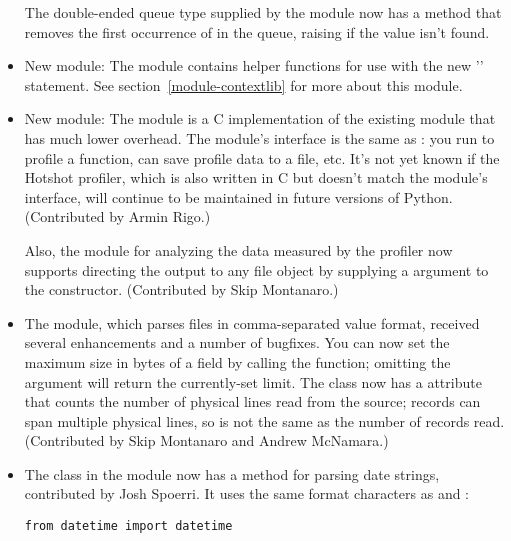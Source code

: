\documentclass{howto}
\begin{document}
\begin{itemize}
The  double-ended queue type supplied by the
 module now has a 
method that removes the first occurrence of  in the queue,
raising  if the value isn't found.

\item New module: The  module contains helper functions for use 
with the new '' statement.  See
section~\ref{module-contextlib} for more about this module.

\item New module: The  module is a C implementation of 
the existing  module that has much lower overhead.
The module's interface is the same as : you run
 to profile a function, can save profile
data to a file, etc.  It's not yet known if the Hotshot profiler,
which is also written in C but doesn't match the 
module's interface, will continue to be maintained in future versions
of Python.  (Contributed by Armin Rigo.)

Also, the  module for analyzing the data measured by
the profiler now supports directing the output to any file object
by supplying a  argument to the  constructor.
(Contributed by Skip Montanaro.)

\item The  module, which parses files in
comma-separated value format, received several enhancements and a
number of bugfixes.  You can now set the maximum size in bytes of a
field by calling the 
function; omitting the  argument will return the
currently-set limit.  The  class now has a
 attribute that counts the number of physical lines
read from the source; records can span multiple physical lines, so
 is not the same as the number of records read.
(Contributed by Skip Montanaro and Andrew McNamara.)

\item The  class in the  
module now has a  
method for parsing date strings, contributed by Josh Spoerri.
It uses the same format characters as  and
:

\begin{verbatim}
from datetime import datetime


\end{verbatim}
\end{itemize}
\end{document}
